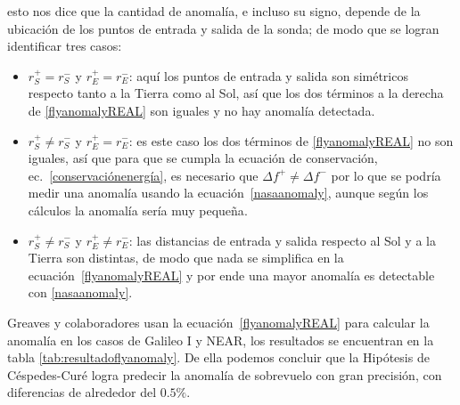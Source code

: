esto nos dice que la cantidad de anomalía, e incluso su signo, depende de la ubicación de los puntos de entrada y salida de la sonda; de modo que se logran identificar tres casos:
\begin{itemize}
    \item $r_S^+=r_S^-$ y $r_E^+=r_E^-$: aquí los puntos de entrada y salida son simétricos respecto tanto a la Tierra como al Sol, así que los dos términos a la derecha de \eqref{flyanomalyREAL} son iguales y no hay anomalía detectada.

    
    \item $r_S^+ \neq r_S^-$ y $r_E^+=r_E^-$: es este caso los dos términos de \eqref{flyanomalyREAL} no son iguales, así que para que se cumpla la ecuación de conservación, ec.~\ref{conservaciónenergía}, es necesario que $\Delta f^+ \neq \Delta f^-$ por lo que se podría medir una anomalía usando la ecuación~\ref{nasaanomaly}, aunque según los cálculos la anomalía sería muy pequeña\cite{Greavesflyby}.

    
    \item $r_S^+ \neq r_S^-$ y $r_E^+ \neq r_E^-$: las distancias de entrada y salida respecto al Sol y a la Tierra son distintas, de modo que nada se simplifica en la ecuación~\ref{flyanomalyREAL} y por ende una mayor anomalía es detectable con \eqref{nasaanomaly}.
\end{itemize}

Greaves y colaboradores usan la ecuación~\ref{flyanomalyREAL} para calcular la anomalía en los casos de Galileo I y NEAR, los resultados se encuentran en la tabla \ref{tab:resultadoflyanomaly}. De ella podemos concluir que la Hipótesis de Céspedes-Curé logra predecir la anomalía de sobrevuelo con gran precisión, con diferencias de alrededor del $0.5\%$.

